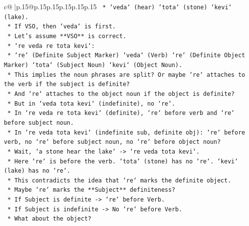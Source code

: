 \documentclass{article}
\begin{document}
{\begin{supertabular}{c@{$\;$}|p{.15\linewidth}@{}p{.15\linewidth}p{.15\linewidth}p{.15\linewidth}p{.15\linewidth}p{.15\linewidth}}
{{{\texttt{                                        *   `veda` (hear) `tota` (stone) `kevi` (lake).} \\
\texttt{                                        *   If VSO, then `veda` is first.} \\
\texttt{                                    *   Let's assume **VSO** is correct.} \\
\texttt{                                    *   `re veda re tota kevi`:} \\
\texttt{                                        *   `re` (Definite Subject Marker) `veda` (Verb) `re` (Definite Object Marker) `tota` (Subject Noun) `kevi` (Object Noun).} \\
\texttt{                                        *   This implies the noun phrases are split? Or maybe `re` attaches to the verb if the subject is definite?} \\
\texttt{                                        *   And `re` attaches to the object noun if the object is definite?} \\
\texttt{                                        *   But in `veda tota kevi` (indefinite), no `re`.} \\
\texttt{                                        *   In `re veda re tota kevi` (definite), `re` before verb and `re` before subject noun.} \\
\texttt{                                        *   In `re veda tota kevi` (indefinite sub, definite obj): `re` before verb, no `re` before subject noun, no `re` before object noun?} \\
\texttt{                                            *   Wait, `a stone hear the lake` {-}> `re veda tota kevi`.} \\
\texttt{                                            *   Here `re` is before the verb. `tota` (stone) has no `re`. `kevi` (lake) has no `re`.} \\
\texttt{                                            *   This contradicts the idea that `re` marks the definite object.} \\
\texttt{                                            *   Maybe `re` marks the **Subject** definiteness?} \\
\texttt{                                            *   If Subject is definite {-}> `re` before Verb.} \\
\texttt{                                            *   If Subject is indefinite {-}> No `re` before Verb.} \\
\texttt{                                            *   What about the object?} \\
}}}
\end{supertabular}}
\end{document}
